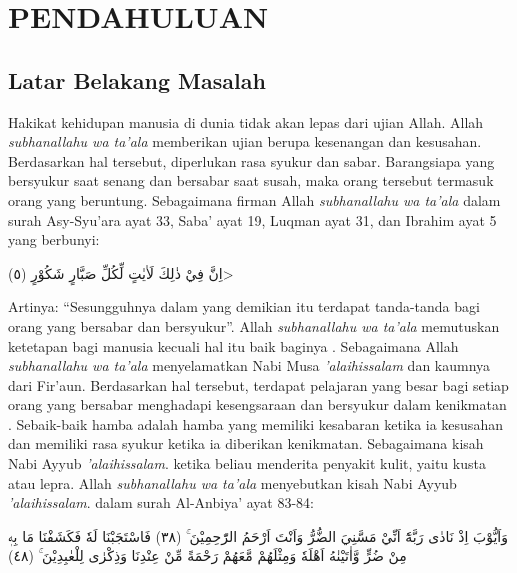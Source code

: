 \chapter{PENDAHULUAN}
    \section{Latar Belakang Masalah}

    Hakikat kehidupan manusia di dunia tidak akan lepas dari ujian Allah. Allah \textit{subhanallahu wa ta'ala} memberikan ujian berupa kesenangan dan kesusahan. Berdasarkan hal tersebut, diperlukan rasa syukur dan sabar. Barangsiapa yang bersyukur saat senang dan bersabar saat susah, maka orang tersebut termasuk orang yang beruntung. Sebagaimana firman Allah \textit{subhanallahu wa ta'ala} dalam surah Asy-Syu’ara ayat 33, Saba’ ayat 19, Luqman ayat 31, dan Ibrahim ayat 5 yang berbunyi:

    \begin{flushright}
        \<اِنَّ فِيْ ذٰلِكَ لَاٰيٰتٍ لِّكُلِّ صَبَّارٍ شَكُوْرٍ (٥)>
    \end{flushright}

    Artinya: “Sesungguhnya dalam yang demikian itu terdapat tanda-tanda bagi orang yang bersabar dan bersyukur”. Allah \textit{subhanallahu wa ta'ala} memutuskan ketetapan bagi manusia kecuali hal itu baik baginya \citep{Ramdhan2019}. Sebagaimana Allah \textit{subhanallahu wa ta'ala} menyelamatkan Nabi Musa \textit{'alaihissalam} dan kaumnya dari Fir’aun. Berdasarkan hal tersebut, terdapat pelajaran yang besar bagi setiap orang yang bersabar menghadapi kesengsaraan dan bersyukur dalam kenikmatan \citep{Muaziroh2018}. Sebaik-baik hamba adalah hamba yang memiliki kesabaran ketika ia kesusahan dan memiliki rasa syukur ketika ia diberikan kenikmatan. Sebagaimana kisah Nabi Ayyub \textit{'alaihissalam}. ketika beliau menderita penyakit kulit, yaitu kusta atau lepra. Allah \textit{subhanallahu wa ta'ala} menyebutkan kisah Nabi Ayyub \textit{'alaihissalam}. dalam surah Al-Anbiya’ ayat 83-84:

    \begin{flushright}
        \begin{RLtext}
            وَاَيُّوْبَ اِذْ نَادٰى رَبَّهٗٓ اَنِّيْ مَسَّنِيَ الضُّرُّ وَاَنْتَ اَرْحَمُ الرّٰحِمِيْنَ ۚ (٣٨) فَاسْتَجَبْنَا لَهٗ فَكَشَفْنَا مَا بِهٖ مِنْ ضُرٍّ وَّاٰتَيْنٰهُ اَهْلَهٗ وَمِثْلَهُمْ مَّعَهُمْ رَحْمَةً مِّنْ عِنْدِنَا وَذِكْرٰى لِلْعٰبِدِيْنَ ۚ (٤٨)
        \end{RLtext}
    \end{flushright}

